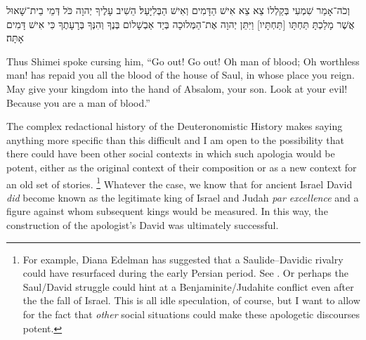 \begin{hebrewtext}
    וְכֹה־אָמַר שִׁמְעִי בְּקַלְלוֹ צֵא צֵא אִישׁ הַדָּמִים וְאִישׁ הַבְּלִיָּעַל׃ 
    הֵשִׁיב עָלֶיךָ יְהוָה כֹּל דְּמֵי בֵית־שָׁאוּל אֲשֶׁר מָלַכְתָּ תַּחְתָּו [תַּחְתָּיו] וַיִּתֵּן יְהוָה אֶת־הַמְּלוּכָה בְּיַד אַבְשָׁלוֹם בְּנֶךָ וְהִנְּךָ בְּרָעָתֶךָ כִּי אִישׁ דָּמִים אָתָּה׃
\end{hebrewtext}
\begin{translation}
    Thus Shimei spoke cursing him, ``Go out! Go out! Oh man of blood; Oh worthless man! \yahweh has repaid you all the blood of the house of Saul, in whose place you reign. May \yahweh give your kingdom into the hand of Absalom, your son. Look at your evil! Because you are a man of blood.''
\end{translation}
\noindent
The complex redactional history of the Deuteronomistic History makes saying anything more specific than this difficult and I am open to the possibility that there could have been other social contexts in which such apologia would be potent, either as the original context of their composition or as a new context for an old set of stories.%
    \footnote{For example, Diana Edelman has suggested that a Saulide--Davidic rivalry could have resurfaced during the early Persian period. See \cite{edelman_dearman-graham2002}. Or perhaps the Saul/David struggle could hint at a Benjaminite/Judahite conflict even after the the fall of Israel. This is all idle speculation, of course, but I want to allow for the fact that \emph{other} social situations could make these apologetic discourses potent.}
Whatever the case, we know that for ancient Israel David \emph{did} become known as the legitimate king of Israel and Judah \emph{par excellence} and a figure against whom subsequent kings would be measured. In this way, the construction of the apologist's David was ultimately successful.%

